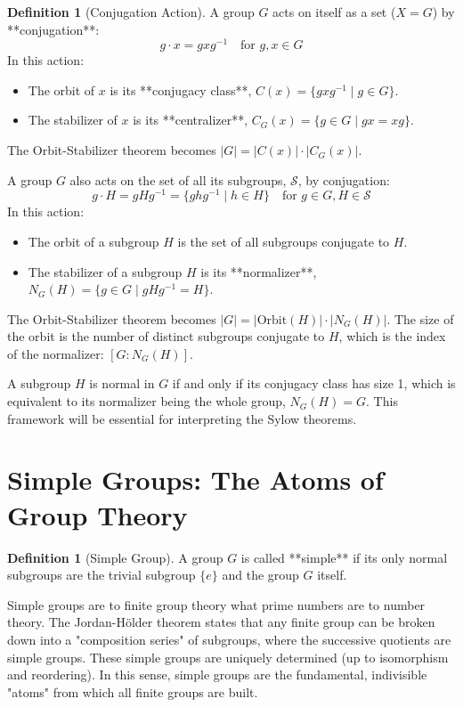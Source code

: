 \documentclass[12pt,a4paper]{article}
\theoremstyle{plain} %
\theoremstyle{definition} %
\newtheorem{definition}[theorem]{Definition}
\theoremstyle{remark} %
\begin{document}
\begin{definition}[Conjugation Action]
A group $G$ acts on itself as a set ($X=G$) by **conjugation**:
\[
g \cdot x = gxg^{-1} \quad \text{for } g,x \in G
\]
In this action:
\begin{itemize}
    \item The orbit of $x$ is its **conjugacy class**, $C(x) = \{gxg^{-1} \mid g \in G\}$.
    \item The stabilizer of $x$ is its **centralizer**, $C_G(x) = \{g \in G \mid gx=xg\}$.
\end{itemize}
The Orbit-Stabilizer theorem becomes $|G| = |C(x)| \cdot |C_G(x)|$.

A group $G$ also acts on the set of all its subgroups, $\mathcal{S}$, by conjugation:
\[
g \cdot H = gHg^{-1} = \{ghg^{-1} \mid h \in H\} \quad \text{for } g \in G, H \in \mathcal{S}
\]
In this action:
\begin{itemize}
    \item The orbit of a subgroup $H$ is the set of all subgroups conjugate to $H$.
    \item The stabilizer of a subgroup $H$ is its **normalizer**, $N_G(H) = \{g \in G \mid gHg^{-1}=H\}$.
\end{itemize}
The Orbit-Stabilizer theorem becomes $|G| = |\text{Orbit}(H)| \cdot |N_G(H)|$. The size of the orbit is the number of distinct subgroups conjugate to $H$, which is the index of the normalizer: $[G : N_G(H)]$.
\end{definition}

A subgroup $H$ is normal in $G$ if and only if its conjugacy class has size 1, which is equivalent to its normalizer being the whole group, $N_G(H)=G$. This framework will be essential for interpreting the Sylow theorems.

\newpage
\section{Simple Groups: The Atoms of Group Theory}

\begin{definition}[Simple Group]
A group $G$ is called **simple** if its only normal subgroups are the trivial subgroup $\{e\}$ and the group $G$ itself.
\end{definition}

Simple groups are to finite group theory what prime numbers are to number theory. The Jordan-H\"older theorem states that any finite group can be broken down into a "composition series" of subgroups, where the successive quotients are simple groups. These simple groups are uniquely determined (up to isomorphism and reordering). In this sense, simple groups are the fundamental, indivisible "atoms" from which all finite groups are built.
\end{document}
